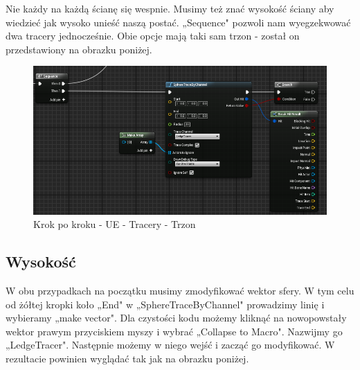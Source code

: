 \documentclass[12pt]{xmgr}
\begin{document}
Nie każdy na każdą ścianę się wespnie. Musimy też znać wysokość ściany aby wiedzieć jak wysoko unieść naszą postać. „Sequence" pozwoli nam wyegzekwować dwa tracery jednocześnie. Obie opcje mają taki sam trzon - został on przedstawiony na obrazku poniżej.

\begin{figure}[!htb]
    \begin{center}
    \includegraphics[scale=0.5]{Screeny/UeKrokPoKroku/UE-Tracer}
    \end{center}
    \caption{Krok po kroku - UE - Tracery - Trzon}
\end{figure}

\subsection{Wysokość}

W obu przypadkach na początku musimy zmodyfikować wektor sfery. W tym celu od żółtej kropki koło „End" w „SphereTraceByChannel" prowadzimy linię i wybieramy „make vector". Dla czystości kodu możemy kliknąć na nowopowstały wektor prawym przyciskiem myszy i wybrać „Collapse to Macro". Nazwijmy go „LedgeTracer". Następnie możemy w niego wejść i zacząć go modyfikować. W rezultacie powinien wyglądać tak jak na obrazku poniżej.
\end{document}
